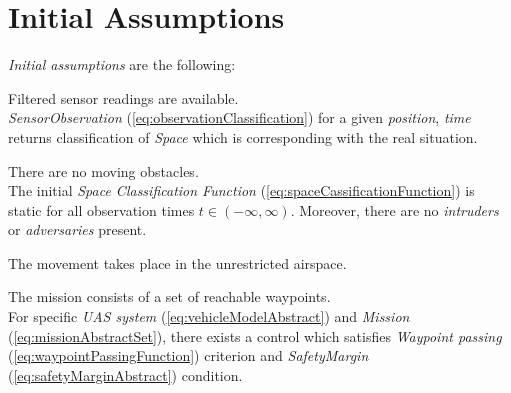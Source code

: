 \section{Initial Assumptions} \label{s:initialAssumptions}
    \noindent\emph{Initial assumptions} are the following:

    \begin{assumption}
        {Filtered sensor readings are available}\label{ass:filteredSensors}.\\
        \emph{SensorObservation} (\ref{eq:observationClassification}) for a given \emph{position}, \emph{time} returns classification of \emph{Space} which is corresponding with the real situation.
    \end{assumption}
    
    \begin{assumption}
        {There are no moving obstacles}\label{ass:noMovingObstacles}.\\
        The initial \emph{Space Classification Function} (\ref{eq:spaceCassificationFunction}) is static for all observation times $t \in (-\infty,\infty)$. Moreover, there are no \emph{intruders} or \emph{adversaries} present. 
    \end{assumption}

    \begin{assumption}
        {The movement takes place in the unrestricted airspace.}\label{ass:openAir}
    \end{assumption}

    \begin{assumption}
        {The mission consists of a set of reachable waypoints}\label{ass:reachableWaypoints}.\\
        For specific \emph{UAS system} (\ref{eq:vehicleModelAbstract}) and  \emph{Mission} (\ref{eq:missionAbstractSet}), there exists a control which satisfies \emph{Waypoint passing} (\ref{eq:waypointPassingFunction}) criterion and \emph{SafetyMargin} (\ref{eq:safetyMarginAbstract}) condition.
    \end{assumption}
    
